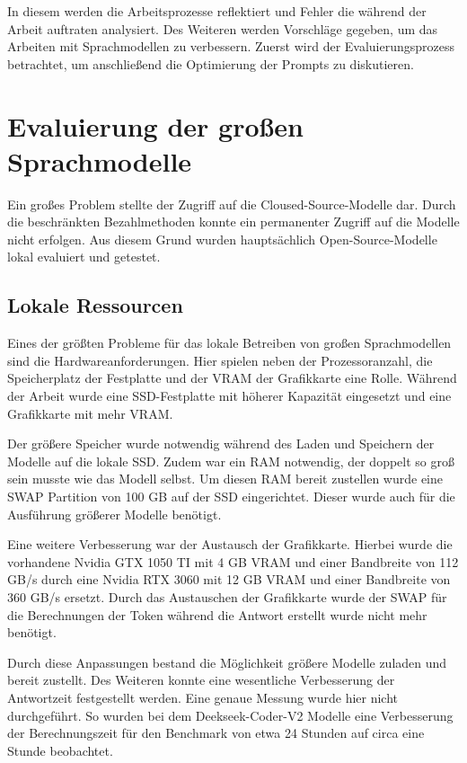 In diesem werden die Arbeitsprozesse reflektiert und Fehler die während der Arbeit auftraten analysiert. Des Weiteren werden Vorschläge gegeben, um das Arbeiten mit Sprachmodellen zu verbessern. Zuerst wird der Evaluierungsprozess betrachtet, um anschließend die Optimierung der Prompts zu diskutieren.



\section{Evaluierung der großen Sprachmodelle}
Ein großes Problem stellte der Zugriff auf die Cloused-Source-Modelle dar. Durch die beschränkten Bezahlmethoden konnte ein permanenter Zugriff auf die Modelle nicht erfolgen. Aus diesem Grund wurden hauptsächlich Open-Source-Modelle lokal evaluiert und getestet.


\subsection{Lokale Ressourcen}
Eines der größten Probleme für das lokale Betreiben von großen Sprachmodellen sind die Hardwareanforderungen. Hier spielen neben der Prozessoranzahl, die Speicherplatz der Festplatte und der VRAM der Grafikkarte eine Rolle. Während der Arbeit wurde eine SSD-Festplatte mit höherer Kapazität eingesetzt und eine Grafikkarte mit mehr VRAM.\vspace{0.2cm}

Der größere Speicher wurde notwendig während des Laden und Speichern der Modelle auf die lokale SSD. Zudem war ein RAM notwendig, der doppelt so groß sein musste wie das Modell selbst. Um diesen RAM bereit zustellen wurde eine SWAP Partition von 100 GB auf der SSD eingerichtet. Dieser wurde auch für die Ausführung größerer Modelle benötigt.\vspace{0.2cm}

Eine weitere Verbesserung war der Austausch der Grafikkarte. Hierbei wurde die vorhandene Nvidia GTX 1050 TI mit 4 GB VRAM und einer Bandbreite von 112 GB/s durch eine Nvidia RTX 3060 mit 12 GB VRAM und einer Bandbreite von 360 GB/s ersetzt. Durch das Austauschen der Grafikkarte wurde der SWAP für die Berechnungen der Token während die Antwort erstellt wurde nicht mehr benötigt.

Durch diese Anpassungen bestand die Möglichkeit größere Modelle zuladen und bereit zustellt. Des Weiteren konnte eine wesentliche Verbesserung der Antwortzeit festgestellt werden. Eine genaue Messung wurde hier nicht durchgeführt. So wurden bei dem Deekseek-Coder-V2 Modelle eine Verbesserung der Berechnungszeit für den Benchmark von etwa 24 Stunden auf circa eine Stunde beobachtet.\vspace{0.2cm}

